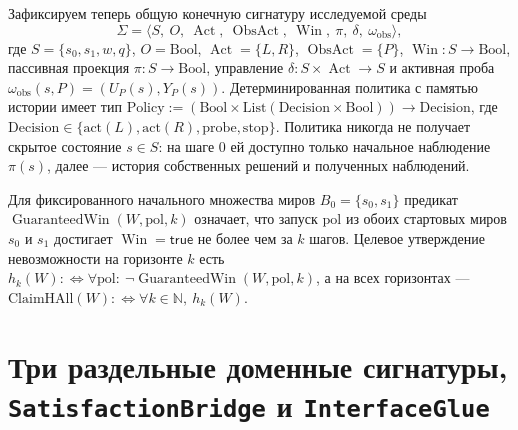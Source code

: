 \documentclass[10pt,a4paper]{article}
\theoremstyle{cleanthm}
\theoremstyle{cleandef}
\DeclareMathOperator{\Win}{Win}
\DeclareMathOperator{\Act}{Act}
\DeclareMathOperator{\ObsAct}{ObsAct}
\DeclareMathOperator{\GuaranteedWin}{GuaranteedWin}
\begin{document}
Зафиксируем теперь общую конечную сигнатуру исследуемой среды
\begin{equation}
  \Sigma = \langle S,\ O,\ \Act,\ \ObsAct,\ \Win,\ \pi,\ \delta,\ \omega_{\mathrm{obs}} \rangle,
\end{equation}
где $S=\{s_0,s_1,w,q\}$, $O=\mathrm{Bool}$, $\Act=\{L,R\}$, $\ObsAct=\{P\}$, $\Win:S\to\mathrm{Bool}$, пассивная проекция $\pi:S\to\mathrm{Bool}$, управление $\delta:S\times\Act\to S$ и активная проба $\omega_{\mathrm{obs}}(s,P)=(U_P(s), Y_P(s))$. Детерминированная политика с памятью истории имеет тип $\mathrm{Policy} := (\mathrm{Bool}\times\mathrm{List}(\mathrm{Decision}\times\mathrm{Bool}))\to\mathrm{Decision}$, где $\mathrm{Decision}\in\{\mathrm{act}(L),\mathrm{act}(R),\mathrm{probe},\mathrm{stop}\}$. Политика никогда не получает скрытое состояние $s\in S$: на шаге $0$ ей доступно только начальное наблюдение $\pi(s)$, далее — история собственных решений и полученных наблюдений.

Для фиксированного начального множества миров $B_0=\{s_0,s_1\}$ предикат $\GuaranteedWin(W,\mathrm{pol},k)$ означает, что запуск $\mathrm{pol}$ из обоих стартовых миров $s_0$ и $s_1$ достигает $\Win=\mathsf{true}$ не более чем за $k$ шагов. Целевое утверждение невозможности на горизонте $k$ есть $h_k(W) :\iff \forall\mathrm{pol}:\ \neg\GuaranteedWin(W,\mathrm{pol},k)$, а на всех горизонтах — $\mathrm{ClaimHAll}(W) :\iff \forall k\in\mathbb{N},\ h_k(W)$.

\section{Три раздельные доменные сигнатуры, \texorpdfstring{\texttt{Satisfaction\allowbreak Bridge}}{SatisfactionBridge} и \texorpdfstring{\texttt{InterfaceGlue}}{InterfaceGlue}}
\end{document}
